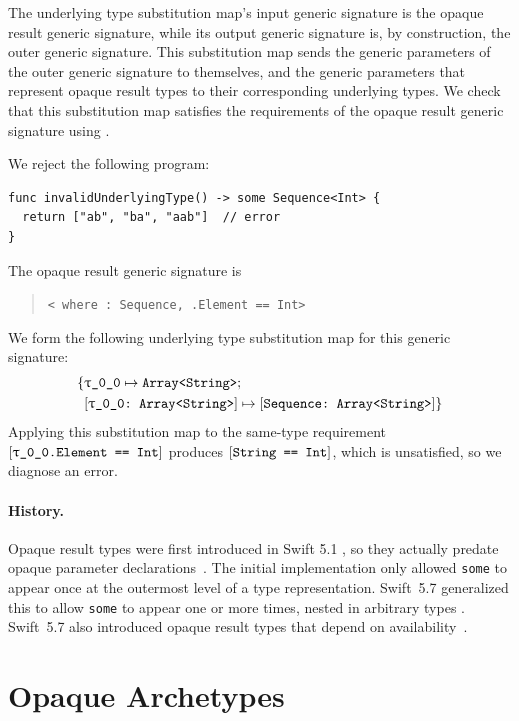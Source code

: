 \documentclass[../generics]{subfiles}
\begin{document}
The underlying type substitution map's input generic signature is the opaque result generic signature, while its output generic signature is, by construction, the outer generic signature. This substitution map sends the generic parameters of the outer generic signature to themselves, and the generic parameters that represent opaque result types to their corresponding underlying types. We check that this substitution map satisfies the requirements of the opaque result generic signature using .

\begin{example}
We reject the following program:
\begin{Verbatim}
func invalidUnderlyingType() -> some Sequence<Int> {
  return ["ab", "ba", "aab"]  // error
}
\end{Verbatim}
The opaque result generic signature is
\begin{quote}
\texttt{<\rT\ where \rT:\ Sequence, \rT.Element == Int>}
\end{quote}
We form the following underlying type substitution map for this generic signature:
\begin{align*}
\SubstMapC{&\SubstType{\rT}{Array<String>}
}{\\
&\SubstConf{\rT}{Sequence}{Array<String>}
}
\end{align*}
Applying this substitution map to the same-type requirement $\SameReq{\rT.Element}{Int}$ produces $[\texttt{String == Int}]$, which is unsatisfied, so we diagnose an error.
\end{example}

\paragraph{History.}
Opaque result types were first introduced in Swift 5.1 \cite{se0244}, so they actually predate opaque parameter declarations~\cite{se0341}. The initial implementation only allowed \texttt{some} to appear once at the outermost level of a type representation. Swift~5.7 generalized this to allow \texttt{some} to appear one or more times, nested in arbitrary types \cite{se0328}. Swift~5.7 also introduced opaque result types that depend on availability~\cite{se0360}.

\section{Opaque Archetypes}\label{sec:opaque archetypes}
\end{document}
